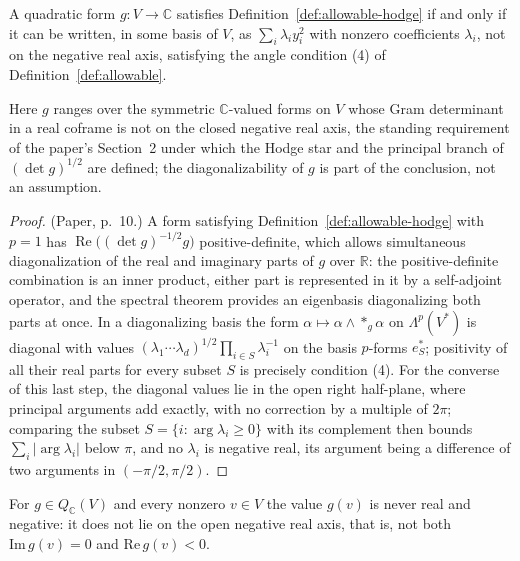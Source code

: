 \begin{theorem}
  \label{thm:angle-equiv}
  \leanok
  A quadratic form $g \colon V \to \mathbb C$ satisfies
  Definition~\ref{def:allowable-hodge} if and only if it can be written, in
  some basis of $V$, as $\sum_i \lambda_i y_i^2$ with nonzero coefficients
  $\lambda_i$, not on the negative real axis, satisfying the angle
  condition (4) of Definition~\ref{def:allowable}.

  Here $g$ ranges over the symmetric $\mathbb C$-valued forms on $V$ whose
  Gram determinant in a real coframe is not on the closed negative real
  axis, the standing requirement of the paper's Section~2 under which the
  Hodge star and the principal branch of $(\det g)^{1/2}$ are defined; the
  diagonalizability of $g$ is part of the conclusion, not an assumption.
\end{theorem}

\begin{proof}
  \leanok
  (Paper, p.~10.) A form satisfying Definition~\ref{def:allowable-hodge} with
  $p = 1$ has $\operatorname{Re}\bigl((\det g)^{-1/2} g\bigr)$
  positive-definite, which allows simultaneous diagonalization of the real
  and imaginary parts of $g$ over $\mathbb R$: the positive-definite
  combination is an inner product, either part is represented in it by a
  self-adjoint operator, and the spectral theorem provides an eigenbasis
  diagonalizing both parts at once. In a diagonalizing basis the
  form $\alpha \mapsto \alpha \wedge *_g \alpha$ on $\Lambda^p(V^*)$ is
  diagonal with values
  $(\lambda_1 \cdots \lambda_d)^{1/2} \prod_{i \in S} \lambda_i^{-1}$ on the
  basis $p$-forms $e_S^*$; positivity of all their real parts for every
  subset $S$ is precisely condition (4). For the converse of this last
  step, the diagonal values lie in the open right half-plane, where
  principal arguments add exactly, with no correction by a multiple of
  $2\pi$; comparing the subset $S = \{i : \arg \lambda_i \geq 0\}$ with its
  complement then bounds $\sum_i |\arg \lambda_i|$ below $\pi$, and no
  $\lambda_i$ is negative real, its argument being a difference of two
  arguments in $(-\pi/2, \pi/2)$.
\end{proof}

\begin{lemma}
  \label{lem:convex-cone}
  \leanok
  For $g \in Q_{\mathbb C}(V)$ and every nonzero $v \in V$ the value $g(v)$
  is never real and negative: it does not lie on the open negative real
  axis, that is, not both $\mathrm{Im}\, g(v) = 0$ and $\mathrm{Re}\, g(v) < 0$.
\end{lemma}

